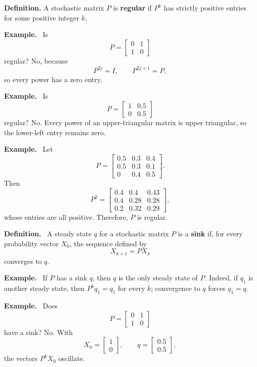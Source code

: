 \documentclass[letterpaper]{article}
\newcommand{\noteheader}[1]{\par\medskip\noindent\textbf{#1}\ }
\begin{document}
\clearpage

\textbf{Definition.} A stochastic matrix $P$ is \textbf{regular} if $P^k$ has strictly positive entries for some positive integer $k$.

\noteheader{Example.} Is
\[
P=\begin{bmatrix}0&1\\1&0\end{bmatrix}
\]
regular? No, because
\[
P^{2j}=I,
\qquad
P^{2j+1}=P,
\]
so every power has a zero entry.

\noteheader{Example.} Is
\[
P=\begin{bmatrix}1&0.5\\0&0.5\end{bmatrix}
\]
regular? No. Every power of an upper-triangular matrix is upper triangular, so the lower-left entry remains zero.

\clearpage

\noteheader{Example.} Let
\[
P=\begin{bmatrix}
0.5&0.3&0.4\\
0.5&0.3&0.1\\
0&0.4&0.5
\end{bmatrix}.
\]
Then
\[
P^2=
\begin{bmatrix}
0.4&0.4&0.43\\
0.4&0.28&0.28\\
0.2&0.32&0.29
\end{bmatrix},
\]
whose entries are all positive. Therefore, $P$ is regular.

\bigskip

\noteheader{Definition.} A steady state $q$ for a stochastic matrix $P$ is a \textbf{sink} if, for every probability vector $X_0$, the sequence defined by
\[
X_{k+1}=PX_k
\]
converges to $q$.

\noteheader{Example.} If $P$ has a sink $q$, then $q$ is the only steady state of $P$. Indeed, if $q_1$ is another steady state, then $P^kq_1=q_1$ for every $k$; convergence to $q$ forces $q_1=q$.

\noteheader{Example.} Does
\[
P=\begin{bmatrix}0&1\\1&0\end{bmatrix}
\]
have a sink? No. With
\[
X_0=\begin{bmatrix}1\\0\end{bmatrix},
\qquad
q=\begin{bmatrix}0.5\\0.5\end{bmatrix},
\]
the vectors $P^kX_0$ oscillate.
\end{document}
